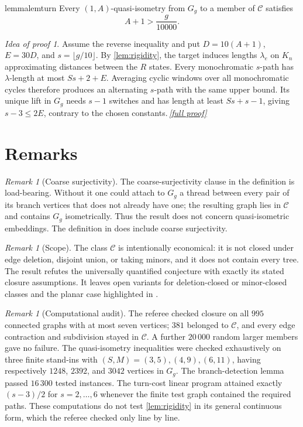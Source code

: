 \documentclass[11pt,a4paper]{article}
\theoremstyle{plain}
\theoremstyle{definition}
\theoremstyle{remark}
\newtheorem{remark}[theorem]{Remark}
\newtheorem*{proofidea}{Idea of proof}
\newcommand{\fullproofref}[1]{\,\hyperref[#1]{\textit{[full proof]}}}
\newcommand{\cC}{\mathcal C}
\newcommand{\Gg}{G_g}
\begin{document}
\begin{restatable}{lemma}{lemturn}\label{lem:turn}
Every $(1,A)$-quasi-isometry from $\Gg$ to a member of $\cC$ satisfies
\[
 A+1>\frac{g}{10000}.
\]
\end{restatable}
\begin{proofidea}
Assume the reverse inequality and put $D=10(A+1)$, $E=30D$, and $s=\lfloor g/10\rfloor$. By \cref{lem:rigidity}, the target induces lengths $\lambda_e$ on $K_n$ approximating distances between the $R$ states. Every monochromatic $s$-path has $\lambda$-length at most $Ss+2+E$. Averaging cyclic windows over all monochromatic cycles therefore produces an alternating $s$-path with the same upper bound. Its unique lift in $\Gg$ needs $s-1$ switches and has length at least $Ss+s-1$, giving $s-3\le2E$, contrary to the chosen constants.\fullproofref{pf:turn}
\end{proofidea}

\section{Remarks}\label{sec:remarks}

\begin{remark}[Coarse surjectivity]
The coarse-surjectivity clause in the definition is load-bearing. Without it one could attach to $\Gg$ a thread between every pair of its branch vertices that does not already have one; the resulting graph lies in $\cC$ and contains $\Gg$ isometrically. Thus the result does not concern quasi-isometric embeddings. The definition in \cite{NSS25} does include coarse surjectivity.
\end{remark}

\begin{remark}[Scope]
The class $\cC$ is intentionally economical: it is not closed under edge deletion, disjoint union, or taking minors, and it does not contain every tree. The result refutes the universally quantified conjecture with exactly its stated closure assumptions. It leaves open variants for deletion-closed or minor-closed classes and the planar case highlighted in \cite{DHH25}.
\end{remark}

\begin{remark}[Computational audit]
The referee checked closure on all $995$ connected graphs with at most seven vertices; $381$ belonged to $\cC$, and every edge contraction and subdivision stayed in $\cC$. A further $20\,000$ random larger members gave no failure. The quasi-isometry inequalities were checked exhaustively on three finite stand-ins with $(S,M)=(3,5),(4,9),(6,11)$, having respectively $1248$, $2392$, and $3042$ vertices in $\Gg$. The branch-detection lemma passed $16\,300$ tested instances. The turn-cost linear program attained exactly $(s-3)/2$ for $s=2,\ldots,6$ whenever the finite test graph contained the required paths. These computations do not test \cref{lem:rigidity} in its general continuous form, which the referee checked only line by line.
\end{remark}
\end{document}
